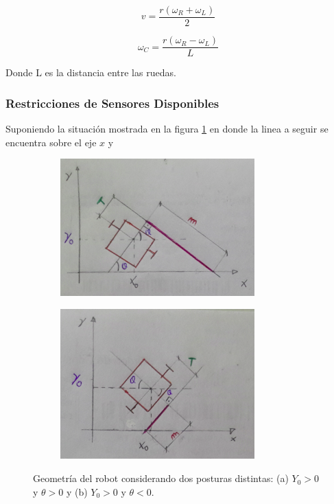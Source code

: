 \documentclass[10pt,conference,a4paper,onecolumn]{article}%
\begin{document}
\begin{equation*}
v=\frac{r(\omega _R + \omega _L)}{2}
\end{equation*}


\begin{equation}
\label{wc}
\omega_{C}=\frac{r(\omega _R - \omega _L) }{L}
\end{equation}

Donde L es la distancia entre las ruedas. 

\subsubsection{Restricciones de Sensores Disponibles}%

Suponiendo la situación mostrada en la figura \ref{fig:posturas} en donde la linea a seguir se encuentra sobre el eje $x$  y 

\begin{figure}[h]
\centering
    \begin{subfigure}[h]{0.45\textwidth}
    	\centering
        \includegraphics[width=7.5cm]{./imagenes/geometria_A.png}
        \caption{}
    \end{subfigure}
    \quad
    \begin{subfigure}[h]{0.45\textwidth}
    	\centering
        \includegraphics[width=7.5cm]{./imagenes/geometria_B.png}
        \caption{}
    \end{subfigure}
    \caption{Geometría del robot considerando dos posturas distintas: (a) $Y_0 >0 $ y $ \theta >0 $ y (b) $Y_0 >0$ y $ \theta <0$.}
	\label{fig:posturas}
\end{figure}
\end{document}
